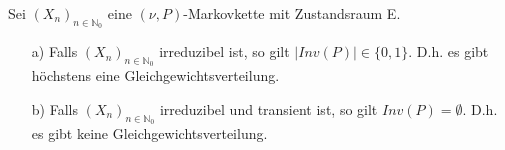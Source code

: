 \label{höchstens eine Gleichverteilung}
Sei $(X_{n})_{n \in \mathbb{N}_{0}}$ eine $(\nu,P)$-Markovkette mit Zustandsraum E.
\begin{itemize}
\item[a)] Falls $(X_{n})_{n \in \mathbb{N}_{0}}$  irreduzibel ist, so gilt $\vert Inv(P) \vert \in \lbrace 0,1 \rbrace$. D.h. es gibt höchstens eine Gleichgewichtsverteilung.
\item[b)] Falls $(X_{n})_{n \in \mathbb{N}_{0}}$ irreduzibel und transient ist, so gilt $Inv(P) = \emptyset$. D.h. es gibt keine Gleichgewichtsverteilung.  
\end{itemize}